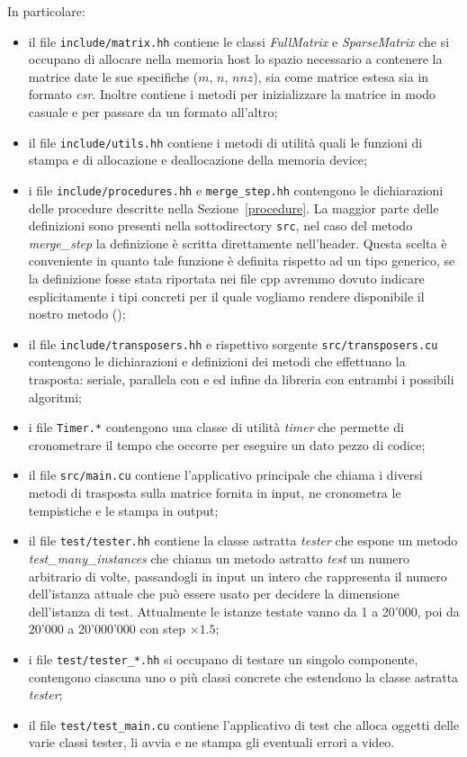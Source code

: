 In particolare:
\begin{itemize}
    \item il file \texttt{include/matrix.hh} contiene le classi \emph{FullMatrix} e \emph{SparseMatrix} che si occupano di allocare nella memoria host lo spazio necessario a contenere la matrice date le sue specifiche ($m$, $n$, $nnz$), sia come matrice estesa sia in formato \emph{csr}. Inoltre contiene i metodi per inizializzare la matrice in modo casuale e per passare da un formato all'altro;
    \item il file \texttt{include/utils.hh} contiene i metodi di utilità quali le funzioni di stampa e di allocazione e deallocazione della memoria device;
    \item i file \texttt{include/procedures.hh} e \texttt{merge\_step.hh} contengono le dichiarazioni delle procedure descritte nella Sezione~\ref{procedure}. La maggior parte delle definizioni sono presenti nella sottodirectory \texttt{src}, nel caso del metodo \emph{merge\_step} la definizione è scritta direttamente nell'header. Questa scelta è conveniente in quanto tale funzione è definita rispetto ad un tipo generico, se la definizione fosse stata riportata nei file cpp avremmo dovuto indicare esplicitamente i tipi concreti per il quale vogliamo rendere disponibile il nostro metodo (\cite{template});
    \item il file \texttt{include/transposers.hh} e rispettivo sorgente \texttt{src/transposers.cu} contengono le dichiarazioni e definizioni dei metodi che effettuano la trasposta: seriale, parallela con \ScanTrans e \MergeTrans ed infine da libreria \cuSPARSE con entrambi i possibili algoritmi;
    \item i file \texttt{Timer.*} contengono una classe di utilità \emph{timer} che permette di cronometrare il tempo che occorre per eseguire un dato pezzo di codice;
    \item il file \texttt{src/main.cu} contiene l'applicativo principale che chiama i diversi metodi di trasposta sulla matrice fornita in input, ne cronometra le tempistiche e le stampa in output;
    \item il file \texttt{test/tester.hh} contiene la classe astratta \emph{tester} che espone un metodo \emph{test\_many\_instances} che chiama un metodo astratto \emph{test} un numero arbitrario di volte, passandogli in input un intero che rappresenta il numero dell'istanza attuale che può essere usato per decidere la dimensione dell'istanza di test. Attualmente le istanze testate vanno da 1 a 20'000, poi da 20'000 a 20'000'000 con step $\times 1.5$; 
    \item i file \texttt{test/tester\_*.hh} si occupano di testare un singolo componente, contengono ciascuna uno o più classi concrete che estendono la classe astratta \emph{tester};
    \item il file \texttt{test/test\_main.cu} contiene l'applicativo di test che alloca oggetti delle varie classi tester, li avvia e ne stampa gli eventuali errori a video.
\end{itemize}
	
